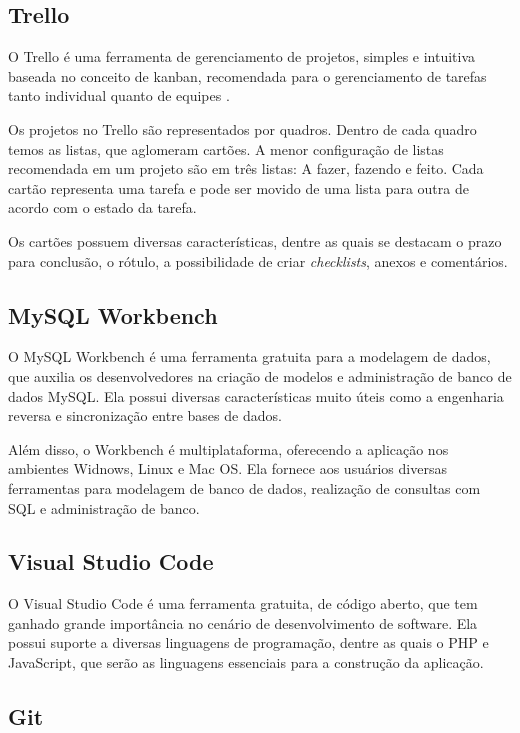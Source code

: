 \subsection{Trello}
\label{sub:trello}

O Trello é uma ferramenta de gerenciamento de projetos, simples e intuitiva baseada no conceito de kanban, recomendada para o gerenciamento de tarefas tanto individual quanto de equipes \cite{cardosopedro2016}.

Os projetos no Trello são representados por quadros. Dentro de cada quadro temos as listas, que aglomeram cartões. A menor configuração de listas recomendada em um projeto são em três listas: A fazer, fazendo e feito. Cada cartão representa uma tarefa e pode ser movido de uma lista para outra de acordo com o estado da tarefa.

Os cartões possuem diversas características, dentre as quais se destacam o prazo para conclusão, o rótulo, a possibilidade de criar \textit{checklists}, anexos e comentários.

\subsection{MySQL Workbench}
\label{sub:workbench}

O MySQL Workbench é uma ferramenta gratuita para a modelagem de dados, que auxilia os desenvolvedores na criação de modelos e administração de banco de dados MySQL. Ela possui diversas características muito úteis como a engenharia reversa e sincronização entre bases de dados.

Além disso, o Workbench é multiplataforma, oferecendo a aplicação nos ambientes Widnows, Linux e Mac OS. Ela fornece aos usuários diversas ferramentas para modelagem de banco de dados, realização de consultas com SQL e administração de banco.

\subsection{Visual Studio Code}
\label{sub:vscode}

O Visual Studio Code é uma ferramenta gratuita, de código aberto, que tem ganhado grande importância no cenário de desenvolvimento de software. Ela possui suporte a diversas linguagens de programação, dentre as quais o PHP e JavaScript, que serão as linguagens essenciais para a construção da aplicação.

\subsection{Git}
\label{sub:git}

